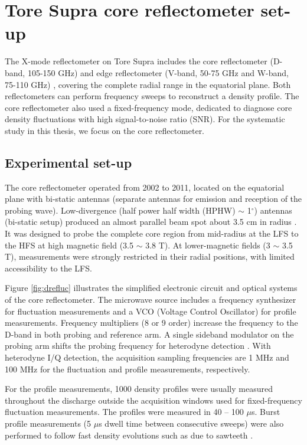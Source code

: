 \section{Tore Supra core reflectometer set-up} \label{sec:drefluc}

The X-mode reflectometer on Tore Supra includes the core reflectometer (D-band, 105-150 GHz)  \cite{Sabot_2006_NF} and edge reflectometer (V-band, 50-75 GHz and W-band, 75-110 GHz) \cite{Clairet_2010_RSI}, covering the complete radial range in the equatorial plane. Both reflectometers can perform frequency sweeps to reconstruct a density profile. The core reflectometer also used a fixed-frequency mode, dedicated to diagnose core density fluctuations with high signal-to-noise ratio (SNR). For the systematic study in this thesis, we focus on the core reflectometer.


\subsection{Experimental set-up}

The core reflectometer operated from 2002 to 2011, located on the equatorial plane with bi-static antennas (separate antennas for emission and reception of the probing wave). Low-divergence (half power half width (HPHW) $\sim$ 1$^\circ$) antennas (bi-static setup) produced an almost parallel beam spot about 3.5 cm in radius \cite{Sabot_2006_NF}. It was designed to probe the complete core region from mid-radius at the LFS to the HFS at high magnetic field (3.5 $\sim$ 3.8 T). At lower-magnetic fields (3 $\sim$ 3.5 T), measurements were strongly restricted in their radial positions, with limited accessibility to the LFS.


Figure \ref{fig:drefluc} illustrates the simplified electronic circuit and optical systems of the core reflectometer. The microwave source includes a frequency synthesizer for fluctuation measurements and a VCO (Voltage Control Oscillator) for profile measurements. Frequency multipliers (8 or 9 order) increase the frequency to the D-band in both probing and reference arm. A single sideband modulator on the probing arm shifts the probing frequency for heterodyne detection \cite{Sabot_2004_RSI}. With heterodyne I/Q detection, the acquisition sampling frequencies are 1 MHz and 100 MHz for the fluctuation and profile measurements, respectively.


For the profile measurements, 1000 density profiles were usually measured throughout the discharge outside the acquisition windows used for fixed-frequency fluctuation measurements. The profiles were measured in 40 -- 100 $\mu$s. Burst profile measurements (5 $\mu$s dwell time between consecutive sweeps) were also performed to follow fast density evolutions such as due to sawteeth \cite{Sabot_2016_CRP}.


